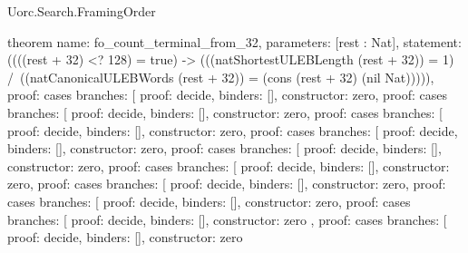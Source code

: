 \begin{lexlean}{Uorc.Search.FramingOrder}
\begin{semanticmodule}
theorem{
  name: fo_count_terminal_from_32,
  parameters: [rest : Nat],
  statement: ((((rest + 32) <? 128) = true) -> (((natShortestULEBLength (rest + 32)) = 1) /\ ((natCanonicalULEBWords (rest + 32)) = (cons (rest + 32) (nil Nat))))),
  proof: cases{
    branches: [
      {proof: decide{}, binders: [], constructor: zero},
      {
        proof: cases{
          branches: [
            {proof: decide{}, binders: [], constructor: zero},
            {
              proof: cases{
                branches: [
                  {proof: decide{}, binders: [], constructor: zero},
                  {
                    proof: cases{
                      branches: [
                        {proof: decide{}, binders: [], constructor: zero},
                        {
                          proof: cases{
                            branches: [
                              {proof: decide{}, binders: [], constructor: zero},
                              {
                                proof: cases{
                                  branches: [
                                    {proof: decide{}, binders: [], constructor: zero},
                                    {
                                      proof: cases{
                                        branches: [
                                          {proof: decide{}, binders: [], constructor: zero},
                                          {
                                            proof: cases{
                                              branches: [
                                                {proof: decide{}, binders: [], constructor: zero},
                                                {
                                                  proof: cases{
                                                    branches: [
                                                      {
                                                        proof: decide{},
                                                        binders: [],
                                                        constructor: zero
                                                      },
                                                      {
                                                        proof: cases{
                                                          branches: [
                                                            {
                                                              proof: decide{},
                                                              binders: [],
                                                              constructor: zero
}}}}}}}}}}}}}}}}}}}}}
\end{semanticmodule}
\end{lexlean}
